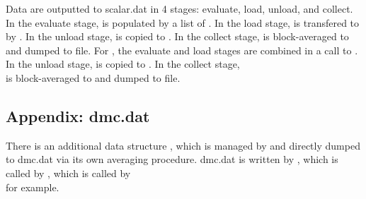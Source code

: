 Data are outputted to scalar.dat in 4 stages: evaluate, load, unload, and collect. In the evaluate stage,  is populated by a list of . In the load stage,  is transfered to  by . In the unload stage,  is copied to . In the collect stage,  is block-averaged to \\  and dumped to file. For , the evaluate and load stages are combined in a call to . In the unload stage,  is copied to . In the collect stage, \\  is block-averaged to  and dumped to file.

\subsection{Appendix: dmc.dat}

\begin{sloppypar}
There is an additional data structure , which is managed by  and directly dumped to dmc.dat via its own averaging procedure. dmc.dat is written by , which is called by , which is called by \\  for example.
\end{sloppypar}
